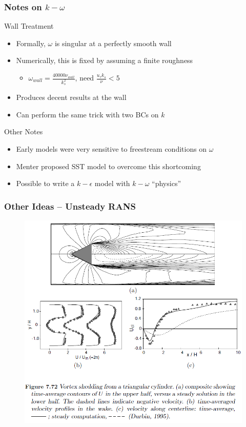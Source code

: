 \documentclass{beamer}
\begin{document}
\begin{frame}\frametitle{Notes on $k-\omega$}
\begin{block}{Wall Treatment}
\begin{itemize}
	\item Formally, $\omega$ is singular at a perfectly smooth wall
	\item Numerically, this is fixed by assuming a finite roughness
	\begin{itemize}
		\item $\omega_{wall}=\frac{40000\nu_{wall}}{k_s^2}$, need $\frac{u_\tau k_s}{\nu}<5$
	\end{itemize}
	\item Produces decent results at the wall
	\item Can perform the same trick with two BCs on $k$
\end{itemize}
\end{block}

\begin{block}{Other Notes}
\begin{itemize}
	\item Early models were very sensitive to freestream conditions on $\omega$
	\item Menter proposed SST model to overcome this shortcoming
	\item Possible to write a $k-\epsilon$ model with $k-\omega$ ``physics''
\end{itemize}
\end{block}
\end{frame}

\begin{frame}\frametitle{Other Ideas -- Unsteady RANS}
\begin{figure}[t]
	\begin{center}
		\includegraphics[height=0.9\textheight]{URANS.png}
	\end{center}
\end{figure}
\end{frame}
\end{document}
